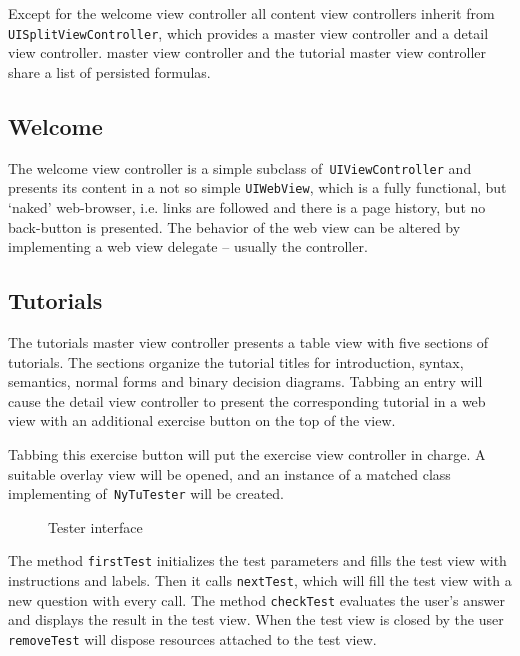 Except for the welcome view controller 
all content view controllers inherit from \verb+UISplitViewController+,
which provides a master view controller and a detail view controller.
\BoolTool master view controller  and the tutorial master view controller share a list of persisted formulas.

\subsection{Welcome}

The welcome view controller is a simple subclass of\verb+ UIViewController+ 
and presents its content in a not so simple \verb+UIWebView+,
which is a fully functional, but ‘naked’ web-browser, i.e. links are followed and there is a page history, but no back-button is presented.
The behavior of the web view can be altered by implementing a web view delegate – usually the controller.

\subsection{Tutorials}

The tutorials master view controller presents a table view with five sections of tutorials.
The sections organize the tutorial titles for 
introduction, syntax, semantics, normal forms and binary decision diagrams.
Tabbing an entry will cause the detail view controller to present the corresponding tutorial in a web view
with an additional exercise button on the top of the view.

Tabbing this exercise button will put the exercise view controller in charge. 
A suitable overlay view will be opened, 
and an instance of a matched class implementing of\verb+ NyTuTester+ will be created.

\begin{figure}[htbp]
\begin{center}
\caption{Tester interface}
\label{fig:Tester}
\end{center}
\end{figure}

The method \verb+firstTest+ initializes the test parameters and fills the test view with instructions and labels. 
Then it calls \verb+nextTest+, which will fill the test view with a new question with every call.
The method \verb+checkTest+ evaluates the user's answer and displays the result in the test view.
When the test view is closed by the user \verb+removeTest+ will dispose resources attached to the test view.

